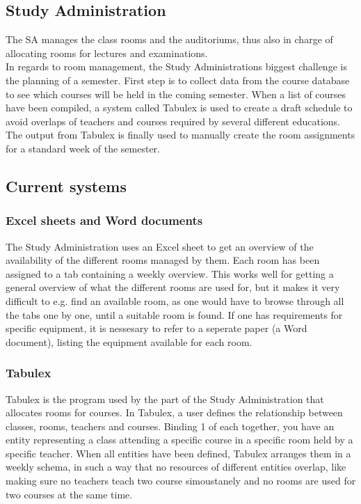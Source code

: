 \subsection{Study Administration}
The SA manages the class rooms and the auditoriums, thus also in charge of allocating rooms for lectures and examinations. \\
In regards to room management, the Study Administrations biggest challenge is the planning of a semester. First step is to collect data from the course database to see which courses will be held in the coming semester. When a list of courses have been compiled, a system called Tabulex is used to create a draft schedule to avoid overlaps of teachers and courses required by several different educations. The output from Tabulex is finally used to manually create the room assignments for a standard week of the semester.\\

\subsection{Current systems}
\label{sub:current_systems}
\subsubsection*{Excel sheets and Word documents}
The Study Administration uses an Excel sheet to get an overview of the availability of the different rooms managed by them. Each room has been assigned to a tab containing a weekly overview. This works well for getting a general overview of what the different rooms are used for, but it makes it very difficult to e.g. find an available room, as one would have to browse through all the tabs one by one, until a suitable room is found. If one has requirements for specific equipment, it is nessesary to refer to a seperate paper (a Word document), listing the equipment available for each room.

\subsubsection*{Tabulex}
\label{subsub:tabulex}
Tabulex is the program used by the part of the Study Administration that allocates rooms for courses. In Tabulex, a user defines the relationship between classes, rooms, teachers and courses. Binding 1 of each together, you have an entity representing a class attending a specific course in a specific room held by a specific teacher. When all entities have been defined, Tabulex arranges them in a weekly schema, in such a way that no resources of different entities overlap, like making sure no teachers teach two course simoustanely and no rooms are used for two courses at the same time.\\

